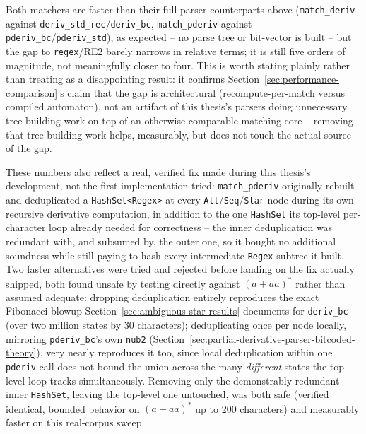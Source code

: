 Both matchers are faster than their full-parser counterparts above
(\texttt{match\_deriv} against \texttt{deriv\_std\_rec}/\texttt{deriv\_bc},
\texttt{match\_pderiv} against \texttt{pderiv\_bc}/\texttt{pderiv\_std}),
as expected -- no parse tree or bit-vector is built -- but the gap to
\texttt{regex}/RE2 barely narrows in relative terms; it is still five
orders of magnitude, not meaningfully closer to four. This is worth
stating plainly rather than treating as a disappointing result: it
confirms Section~\ref{sec:performance-comparison}'s claim that the gap
is architectural (recompute-per-match versus compiled automaton), not an
artifact of this thesis's parsers doing unnecessary tree-building work
on top of an otherwise-comparable matching core -- removing that
tree-building work helps, measurably, but does not touch the actual
source of the gap.

These numbers also reflect a real, verified fix made during this
thesis's development, not the first implementation tried:
\texttt{match\_pderiv} originally rebuilt and deduplicated a
\texttt{HashSet<Regex>} at every \texttt{Alt}/\texttt{Seq}/\texttt{Star}
node during its own recursive derivative computation, in addition to the
one \texttt{HashSet} its top-level per-character loop already needed for
correctness -- the inner deduplication was redundant with, and
subsumed by, the outer one, so it bought no additional soundness while
still paying to hash every intermediate \texttt{Regex} subtree it built.
Two faster alternatives were tried and rejected before landing on the
fix actually shipped, both found unsafe by testing directly against
$(a+aa)^{*}$ rather than assumed adequate: dropping deduplication
entirely reproduces the exact Fibonacci blowup
Section~\ref{sec:ambiguous-star-results} documents for \texttt{deriv\_bc}
(over two million states by 30 characters); deduplicating once per node
locally, mirroring \texttt{pderiv\_bc}'s own \texttt{nub2}
(Section~\ref{sec:partial-derivative-parser-bitcoded-theory}), very
nearly reproduces it too, since local deduplication within one
\texttt{pderiv} call does not bound the union across the many
\emph{different} states the top-level loop tracks simultaneously.
Removing only the demonstrably redundant inner \texttt{HashSet}, leaving
the top-level one untouched, was both safe (verified identical, bounded
behavior on $(a+aa)^{*}$ up to 200 characters) and measurably faster on
this real-corpus sweep.

